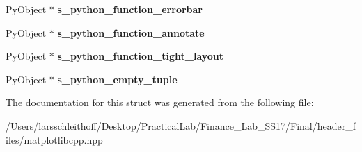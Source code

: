 \begin{DoxyCompactItemize}
Py\+Object $\ast$ {\bfseries s\+\_\+python\+\_\+function\+\_\+errorbar}
\item 
\mbox{\label{structmatplotlibcpp_1_1detail_1_1__interpreter_af63d49cff0820f3324b12da812c9a266}} 
Py\+Object $\ast$ {\bfseries s\+\_\+python\+\_\+function\+\_\+annotate}
\item 
\mbox{\label{structmatplotlibcpp_1_1detail_1_1__interpreter_a72965ea88b282bf62b41ca126341d9a8}} 
Py\+Object $\ast$ {\bfseries s\+\_\+python\+\_\+function\+\_\+tight\+\_\+layout}
\item 
\mbox{\label{structmatplotlibcpp_1_1detail_1_1__interpreter_aaedba936be3a7e8fbcc528991ccace2c}} 
Py\+Object $\ast$ {\bfseries s\+\_\+python\+\_\+empty\+\_\+tuple}
\end{DoxyCompactItemize}


The documentation for this struct was generated from the following file\+:\begin{DoxyCompactItemize}
\item 
/\+Users/larsschleithoff/\+Desktop/\+Practical\+Lab/\+Finance\+\_\+\+Lab\+\_\+\+S\+S17/\+Final/header\+\_\+files/matplotlibcpp.\+hpp\end{DoxyCompactItemize}
